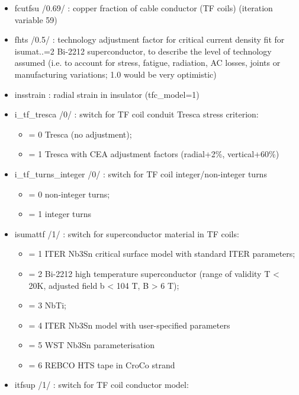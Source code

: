 \documentclass[]{article}
\begin{document}
\begin{itemize}
\item
  fcutfsu /0.69/ : copper fraction of cable conductor (TF coils)
  (iteration variable 59)
\item
  fhts /0.5/ : technology adjustment factor for critical current density
  fit for isumat..=2 Bi-2212 superconductor, to describe the level of
  technology assumed (i.e. to account for stress, fatigue, radiation, AC
  losses, joints or manufacturing variations; 1.0 would be very
  optimistic)
\item
  insstrain : radial strain in insulator (tfc\_model=1)
\item
  i\_tf\_tresca /0/ : switch for TF coil conduit Tresca stress
  criterion:

  \begin{itemize}
  \itemsep1pt\parskip0pt
  \item
    = 0 Tresca (no adjustment);
  \item
    = 1 Tresca with CEA adjustment factors (radial+2\%, vertical+60\%)
  \end{itemize}
\item
  i\_tf\_turns\_integer /0/ : switch for TF coil integer/non-integer
  turns

  \begin{itemize}
  \itemsep1pt\parskip0pt
  \item
    = 0 non-integer turns;
  \item
    = 1 integer turns
  \end{itemize}
\item
  isumattf /1/ : switch for superconductor material in TF coils:

  \begin{itemize}
  \itemsep1pt\parskip0pt
  \item
    = 1 ITER Nb3Sn critical surface model with standard ITER parameters;
  \item
    = 2 Bi-2212 high temperature superconductor (range of validity T
    \textless{} 20K, adjusted field b \textless{} 104 T, B
    \textgreater{} 6 T);
  \item
    = 3 NbTi;
  \item
    = 4 ITER Nb3Sn model with user-specified parameters
  \item
    = 5 WST Nb3Sn parameterisation
  \item
    = 6 REBCO HTS tape in CroCo strand
  \end{itemize}
\item
  itfsup /1/ : switch for TF coil conductor model:


\end{itemize}
\end{document}
